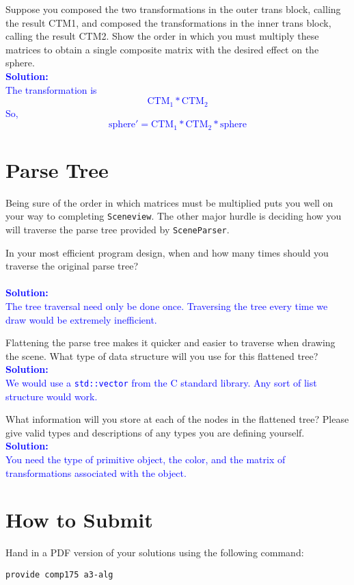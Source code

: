 \documentclass[10pt,twocolumn]{article}
\newcommand{\solution}[1]{\textcolor{Blue}{\\{\bf Solution:} \\ #1}}  %
\begin{document}
\begin{framed}
  Suppose you composed the two transformations in the outer trans block, calling the result CTM1, and composed the transformations in the inner trans block, calling the result CTM2. Show the order in which you must multiply these matrices to obtain a single composite matrix with the desired effect on the sphere.
\solution{
The transformation is \[\text{CTM}_1 * \text{CTM}_2\] So, \[\text{sphere}' = \text{CTM}_1 * \text{CTM}_2 * \text{sphere}\]
}
\end{framed}

\section{Parse Tree}
Being sure of the order in which matrices must be multiplied puts you well on your way to completing {\tt Sceneview}. The other major hurdle is deciding how you will traverse the parse tree provided by {\tt SceneParser}.
\begin{framed}
\noindent {\bf [1 point]} In your most efficient program design, when and how many times should you traverse the original parse tree?\\[5mm]
\solution{
The tree traversal need only be done once. Traversing the tree every time we draw would be extremely inefficient.
}
\end{framed}
\begin{framed}
\noindent {\bf [1 point]} Flattening the parse tree makes it quicker and easier to traverse when drawing the scene. What type of data structure will you use for this flattened tree?
\solution{
We would use a {\tt std::vector} from the C standard library. Any sort of list structure would work.
}
\end{framed}
\begin{framed}
\noindent {\bf [1 point]} What information will you store at each of the nodes in the flattened tree? Please give valid types and descriptions of any types you are defining yourself.
\solution{
You need the type of primitive object, the color, and the matrix of transformations associated with the object.
}
\end{framed}

\section{How to Submit}

Hand in a PDF version of your solutions using the following command:
\begin{center}
 {\tt provide comp175 a3-alg}
 \end{center}
\end{document}
